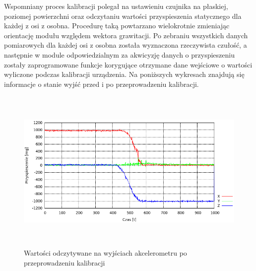 Wspomniany proces kalibracji polegał na ustawieniu czujnika na płaskiej,
poziomej powierzchni oraz odczytaniu wartości przyspieszenia statycznego dla
każdej z osi z osobna. Procedurę taką powtarzano wielokrotnie zmieniając
orientację modułu względem wektora grawitacji. Po zebraniu wszystkich danych
pomiarowych dla każdej osi z osobna została wyznaczona rzeczywista czułość, a
następnie w module odpowiedzialnym za akwicyzję danych o przyspieszeniu zostały
zaprogramowane funkcje korygujące otrzymane dane wejściowe o wartości wyliczone
podczas kalibracji urządzenia. Na poniższych wykresach znajdują się informacje o
stanie wyjść przed i po przeprowadzeniu kalibracji. 
  
\begin{figure}[ht!]
 \centering
 \includegraphics[height=80mm]{../images/ch04/calib_acc_data.png}
 \caption{Wartości odczytywane na wyjściach akcelerometru po przeprowadzeniu kalibracji}
 \label{fig:MMADataCalib}
\end{figure}